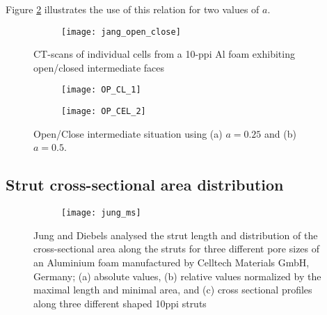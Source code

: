 Figure \ref{open-close2} illustrates the use of this relation for two values of $ a $.

\begin{figure}
	\centering
	\begin{subfigure}[b]{0.5\textwidth}
		\texttt{[image: jang\_open\_close]}
	\end{subfigure}
	\caption{{CT-scans of individual cells from a 10-ppi Al foam exhibiting open/closed intermediate faces} \cite{jangMicrostructureOpencellFoams2008}}\label{open-close1}
\end{figure}

\begin{figure}
	\centering
	\begin{subfigure}[b]{0.45\textwidth}
		\texttt{[image: OP\_CL\_1]}
		\caption{}
	\end{subfigure}
	\begin{subfigure}[b]{0.45\textwidth}
		\texttt{[image: OP\_CEL\_2]}
		\caption{}
	\end{subfigure}
	\caption{Open/Close intermediate situation using (a) $ a=0.25 $ and (b) $ a=0.5 $.}\label{open-close2}
\end{figure}


\subsection{Strut cross-sectional area distribution}\label{of-feature-strut}

\begin{figure}
	\centering
	\begin{subfigure}{\textwidth}
		\texttt{[image: jung\_ms]}
	\end{subfigure}
\caption{Jung and Diebels \cite{jungMicrostructuralCharacterisationExperimental2017} analysed the strut length and distribution of the cross-sectional area along the struts for three different pore sizes of an Aluminium foam manufactured by Celltech Materials GmbH, Germany; (a) absolute values, (b) relative values normalized by the maximal length and minimal area, and (c) cross sectional profiles along three different shaped 10ppi struts}\label{strut4}
\end{figure}

